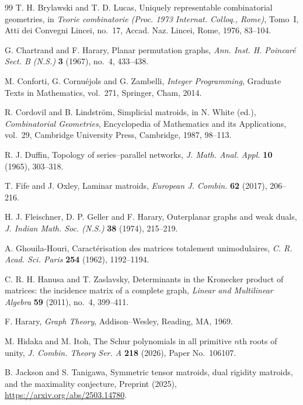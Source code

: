 \documentclass[12pt,a4paper]{article}
\numberwithin{equation}{section}
\theoremstyle{definition}
\theoremstyle{remark}
\begin{document}
\begin{thebibliography}{99}
T. H. Brylawski and T. D. Lucas,
Uniquely representable combinatorial geometries,
in \emph{Teorie combinatorie (Proc. 1973 Internat. Colloq., Rome)},
Tomo~I, Atti dei Convegni Lincei, no.~17,
Accad. Naz. Lincei, Rome, 1976, 83--104.

G. Chartrand and F. Harary,
Planar permutation graphs,
\emph{Ann. Inst. H. Poincar\'e Sect. B (N.S.)}
\textbf{3} (1967), no.~4, 433--438.

M. Conforti, G. Cornu\'ejols and G. Zambelli,
\emph{Integer Programming},
Graduate Texts in Mathematics, vol.~271,
Springer, Cham, 2014.

R. Cordovil and B. Lindstr\"om,
Simplicial matroids,
in N. White (ed.), \emph{Combinatorial Geometries},
Encyclopedia of Mathematics and its Applications, vol.~29,
Cambridge University Press, Cambridge, 1987, 98--113.

R. J. Duffin,
Topology of series--parallel networks,
\emph{J. Math. Anal. Appl.}
\textbf{10} (1965), 303--318.

T. Fife and J. Oxley,
Laminar matroids,
\emph{European J. Combin.}
\textbf{62} (2017), 206--216.

H. J. Fleischner, D. P. Geller and F. Harary,
Outerplanar graphs and weak duals,
\emph{J. Indian Math. Soc. (N.S.)}
\textbf{38} (1974), 215--219.

A. Ghouila-Houri,
Caract\'erisation des matrices totalement unimodulaires,
\emph{C. R. Acad. Sci. Paris}
\textbf{254} (1962), 1192--1194.

C. R. H. Hanusa and T. Zaslavsky,
Determinants in the Kronecker product of matrices: the incidence matrix of a
complete graph,
\emph{Linear and Multilinear Algebra}
\textbf{59} (2011), no.~4, 399--411.

F. Harary,
\emph{Graph Theory},
Addison--Wesley, Reading, MA, 1969.

M. Hidaka and M. Itoh,
The Schur polynomials in all primitive \(n\)th roots of unity,
\emph{J. Combin. Theory Ser. A}
\textbf{218} (2026), Paper No.~106107.

B. Jackson and S. Tanigawa,
Symmetric tensor matroids, dual rigidity matroids, and the maximality
conjecture,
Preprint (2025), \url{https://arxiv.org/abs/2503.14780}.


\end{thebibliography}
\end{document}
